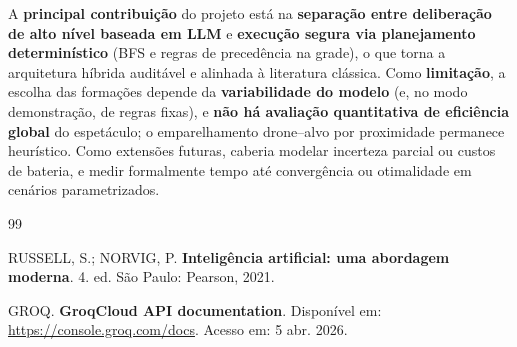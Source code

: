 \documentclass[12pt,a4paper,oneside]{article}
\begin{document}
A \textbf{principal contribuição} do projeto está na \textbf{separação entre deliberação de alto nível baseada em LLM} e \textbf{execução segura via planejamento determinístico} (BFS e regras de precedência na grade), o que torna a arquitetura híbrida auditável e alinhada à literatura clássica. Como \textbf{limitação}, a escolha das formações depende da \textbf{variabilidade do modelo} (e, no modo demonstração, de regras fixas), e \textbf{não há avaliação quantitativa de eficiência global} do espetáculo; o emparelhamento drone--alvo por proximidade permanece heurístico. Como extensões futuras, caberia modelar incerteza parcial ou custos de bateria, e medir formalmente tempo até convergência ou otimalidade em cenários parametrizados.

\newpage
\begin{thebibliography}{99}

RUSSELL, S.; NORVIG, P. \textbf{Inteligência artificial: uma abordagem moderna}. 4. ed. São Paulo: Pearson, 2021.

GROQ. \textbf{GroqCloud API documentation}. Disponível em: \url{https://console.groq.com/docs}. Acesso em: 5 abr. 2026.

\end{thebibliography}
\end{document}
